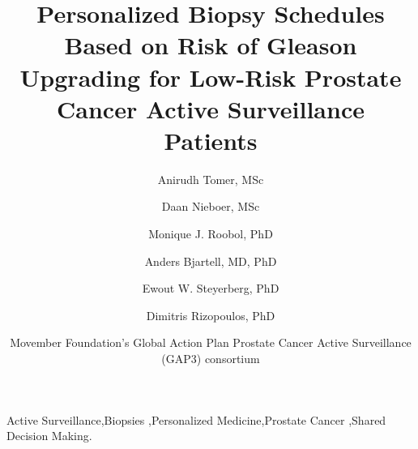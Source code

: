 \documentclass[review, 12pt]{elsarticle}
\begin{document}
\begin{frontmatter}

\title{Personalized Biopsy Schedules Based on Risk of Gleason Upgrading for Low-Risk Prostate Cancer Active Surveillance Patients}

\author[1]{Anirudh Tomer, MSc} 

\author[2,3]{Daan Nieboer, MSc}

\author[3]{Monique J. Roobol, PhD}

\author[4]{Anders Bjartell, MD, PhD}

\author[2,5]{Ewout W. Steyerberg, PhD}

\author[1]{Dimitris Rizopoulos, PhD}

\author[6]{Movember Foundation's Global Action Plan Prostate Cancer Active Surveillance (GAP3) consortium}

\address[1]{Department of Biostatistics, Erasmus University Medical Center, Rotterdam, the Netherlands}
\address[2]{Department of Public Health, Erasmus University Medical Center, Rotterdam, the Netherlands}
\address[3]{Department of Urology, Erasmus University Medical Center, Rotterdam, the Netherlands}
\address[4]{Department of Urology, Sk\r{a}ne University Hospital, Malm\"{o}, Sweden}
\address[5]{Department of Biomedical Data Sciences, Leiden University Medical Center, Leiden, the Netherlands}
\address[6]{The Movember Foundation's Global Action Plan Prostate Cancer Active Surveillance (GAP3) consortium members presented in Appendix A}




\begin{keyword}
Active Surveillance\sep Biopsies \sep Personalized Medicine\sep Prostate Cancer \sep Shared Decision Making.
\end{keyword}

\end{frontmatter}

\linenumbers
\end{document}
